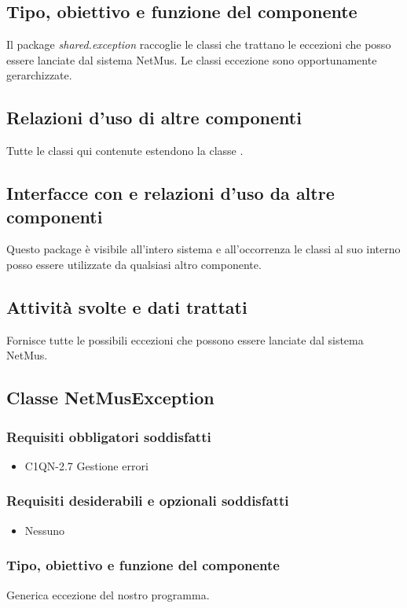 \subsection*{Tipo, obiettivo e funzione del componente}
Il package \emph{shared.exception} raccoglie le classi che trattano
le eccezioni che posso essere lanciate dal sistema NetMus. Le classi eccezione
sono opportunamente gerarchizzate. 
\subsection*{Relazioni d'uso di altre componenti}
Tutte le classi qui contenute estendono la classe .
\subsection*{Interfacce con e relazioni d'uso da altre componenti}
Questo package \`e visibile all'intero sistema e all'occorrenza le classi al suo
interno posso essere utilizzate da qualsiasi altro componente.
\subsection*{Attivit\`a svolte e dati trattati}
Fornisce tutte le possibili eccezioni che possono essere lanciate dal sistema
NetMus.

\subsection{Classe NetMusException}
\subsubsection*{Requisiti obbligatori soddisfatti}
\begin{itemize}
	\item C1QN-2.7 Gestione errori
\end{itemize}
\subsubsection*{Requisiti desiderabili e opzionali soddisfatti}
\begin{itemize}
    \item Nessuno
\end{itemize}
\subsubsection*{Tipo, obiettivo e funzione del componente}
Generica eccezione del nostro programma.
